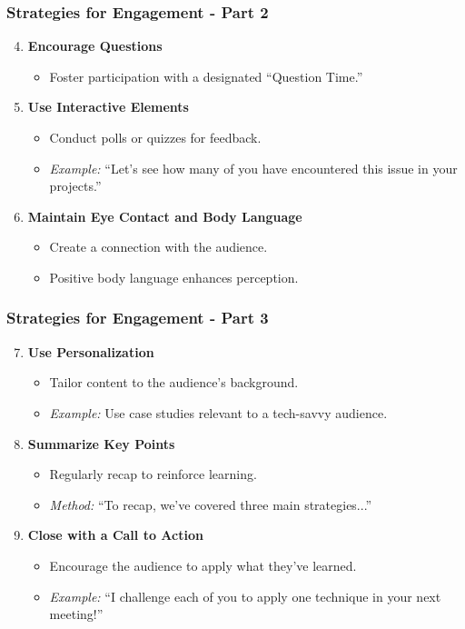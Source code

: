\documentclass[aspectratio=169]{beamer}
\begin{document}
\begin{frame}[fragile]
    \frametitle{Strategies for Engagement - Part 2}
    \begin{enumerate}
        \setcounter{enumi}{3}
        \item \textbf{Encourage Questions}
            \begin{itemize}
                \item Foster participation with a designated “Question Time.”
            \end{itemize}
        \item \textbf{Use Interactive Elements}
            \begin{itemize}
                \item Conduct polls or quizzes for feedback.
                \item \textit{Example:} “Let’s see how many of you have encountered this issue in your projects.”
            \end{itemize}
        \item \textbf{Maintain Eye Contact and Body Language}
            \begin{itemize}
                \item Create a connection with the audience.
                \item Positive body language enhances perception.
            \end{itemize}
    \end{enumerate}
\end{frame}

\begin{frame}[fragile]
    \frametitle{Strategies for Engagement - Part 3}
    \begin{enumerate}
        \setcounter{enumi}{6}
        \item \textbf{Use Personalization}
            \begin{itemize}
                \item Tailor content to the audience's background.
                \item \textit{Example:} Use case studies relevant to a tech-savvy audience.
            \end{itemize}
        \item \textbf{Summarize Key Points}
            \begin{itemize}
                \item Regularly recap to reinforce learning.
                \item \textit{Method:} “To recap, we’ve covered three main strategies...”
            \end{itemize}
        \item \textbf{Close with a Call to Action}
            \begin{itemize}
                \item Encourage the audience to apply what they've learned.
                \item \textit{Example:} “I challenge each of you to apply one technique in your next meeting!”
            \end{itemize}
    \end{enumerate}
\end{frame}
\end{document}
